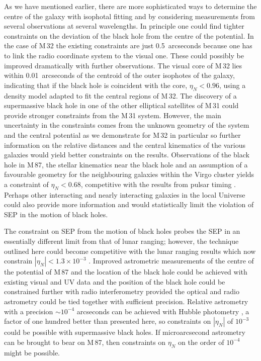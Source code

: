 \documentclass[useAMS,usenatbib]{mn2e}
\begin{document}
As we have mentioned earlier, there are more sophisticated ways to
determine the centre of the galaxy with isophotal fitting and by
considering measurements from several observations at several
wavelengths.  In 
principle 
one could find tighter constraints on the deviation of the black hole
from the centre of the potential.  In the case of M\,32 the existing
constraints are just 0.5~arcseconds because one has to link the radio
coordinate system to the visual one.  These could possibly be improved
dramatically with further observations.  The visual core of M\,32 lies
within 0.01~arcseconds of the centroid of the outer isophotes of the
galaxy, indicating that if the black hole is coincident with the core,
$\eta_N<0.96$, using a density model adapted to fit the central
regions of M\,32.  The discovery of a supermassive black hole in one
of the other elliptical satellites of M\,31 could provide stronger
constraints from the M\,31 system.  However, the main uncertainty in
the constraints comes from the unknown geometry of the system and the
central potential as we demonstrate for M\,32 in particular so further
information on the relative distances and the central kinematics of
the various galaxies would yield better constraints on the results.
Observations of the black hole in M\,87, the stellar kinematics near
the black hole and an assumption of a favourable geometry for the
neighbouring galaxies within the Virgo cluster yields a constraint of
$\eta_N<0.68$, competitive with the results from pulsar timing
\citep{Stairs:2005}.  Perhaps other interacting and nearly interacting
galaxies in the local Universe could also provide more information and
would statistically limit the violation of SEP in the motion of black
holes.

The constraint on SEP from the motion of black holes probes the SEP 
in an essentially different limit 
from that of
lunar ranging; however, the technique outlined here could become
competitive with the lunar ranging results which now constrain
$|\eta_N|<1.3 \times 10^{-3}$ \citep{Baess:1999,2001CQGra..18.2397A}.
Improved astrometric measurements of the centre of the potential of
M\,87 and the location of the black hole could be achieved with
existing visual and UV data and the position of the black hole could
be
constrained 
further with radio 
interferometry 
provided
the optical and radio astrometry could be tied together with
sufficient precision.  Relative astrometry with a precision $\sim
10^{-4}$ arcseconds can be achieved with Hubble photometry
\citep[e.g.][]{Heyl116397dyn}, a factor of one hundred better than
presented here, so constraints on $|\eta_N|$ of $10^{-3}$ could be
possible with supermassive black holes.  If microarcsecond astrometry
can be brought to bear \citep[e.g.][]{2011ApJ...735...57B} on M\,87,
then 
constraints
on $\eta_N$ on the order of $10^{-4}$ might be possible.
\end{document}
